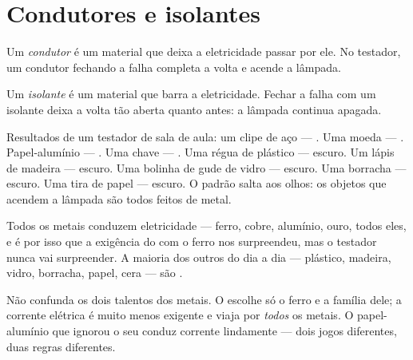 \section{Condutores e isolantes}

\begin{definition}[Condutor]\label{def:g4:conductors-insulators:conductor}
Um \emph{condutor} é um material que deixa a
eletricidade passar por ele. No testador, um condutor fechando a
falha completa a volta e acende a lâmpada.
\end{definition}

\begin{definition}[Isolante]\label{def:g4:conductors-insulators:insulator}
Um \emph{isolante} é um material que barra a
eletricidade. Fechar a falha com um isolante deixa a volta tão aberta
quanto antes: a lâmpada continua apagada.
\end{definition}

\begin{example}\label{ex:g4:conductors-insulators:trials}
Resultados de um testador de sala de aula: um clipe de aço --- .
Uma moeda --- . Papel-alumínio --- . Uma chave --- . Uma
régua de plástico --- escuro. Um lápis de madeira --- escuro. Uma
bolinha de gude de vidro --- escuro. Uma borracha --- escuro. Uma
tira de papel --- escuro. O padrão salta aos olhos: os objetos que
acendem a lâmpada são todos feitos de metal.
\end{example}

\begin{proposition}\label{prop:g4:conductors-insulators:metals}
Todos os metais conduzem eletricidade --- ferro, cobre, alumínio,
ouro, todos eles, e é por isso que a exigência do  com o ferro nos
surpreendeu, mas o testador nunca vai surpreender. A maioria dos
outros  do dia a dia --- plástico, madeira, vidro, borracha,
papel, cera --- são .
\end{proposition}

\begin{remark}\label{rem:g4:conductors-insulators:notmagnet}
Não confunda os dois talentos dos metais. O  escolhe só o ferro e
a família dele; a corrente elétrica é muito menos exigente e viaja
por \emph{todos} os metais. O papel-alumínio que ignorou o seu 
conduz corrente lindamente --- dois jogos diferentes, duas regras
diferentes.
\end{remark}

